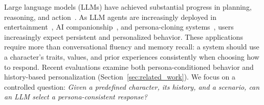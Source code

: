 \documentclass[11pt]{article}
\begin{document}
Large language models (LLMs) have achieved substantial progress in planning, reasoning, and action~\cite{anthropic2026claudeopus47,openai2026gpt55,google2026gemini31pro}. As LLM agents are increasingly deployed in entertainment~\cite{chen2024persona,tseng2024two}, AI companionship~\cite{maples2024loneliness,phang2025investigating}, and persona-cloning systems~\cite{wei2025ai,lee2026creating}, users increasingly expect persistent and personalized behavior. These applications require more than conversational fluency and memory recall: a system should use a character's traits, values, and prior experiences consistently when choosing how to respond. Recent evaluations examine both persona-conditioned behavior and history-based personalization (Section~\ref{sec:related_work}). We focus on a controlled question: \emph{Given a predefined character, its history, and a scenario, can an LLM select a persona-consistent response?}
\end{document}
